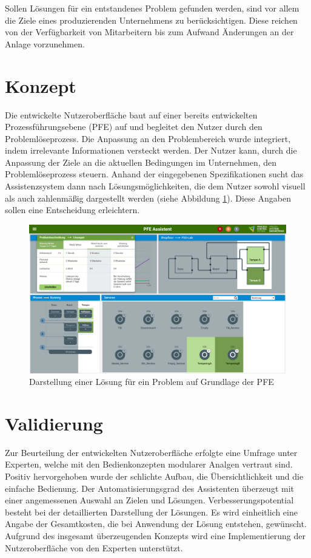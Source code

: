 \documentclass{ifaPoster}
\begin{document}
Sollen Lösungen für ein entstandenes Problem gefunden werden, sind vor allem die Ziele eines produzierenden Unternehmens zu berücksichtigen.
Diese reichen von der Verfügbarkeit von Mitarbeitern bis zum Aufwand Änderungen an der Anlage vorzunehmen.

\section{Konzept}
Die entwickelte Nutzeroberfläche baut auf einer bereits entwickelten Prozessführungsebene (PFE) auf und begleitet den Nutzer durch den Problemlöseprozess. Die Anpassung an den Problembereich wurde integriert, indem irrelevante Informationen versteckt werden. Der Nutzer kann, durch die Anpassung der Ziele an die aktuellen Bedingungen im Unternehmen, den Problemlöseprozess steuern. Anhand der eingegebenen Spezifikationen sucht das Assistenzsystem dann nach Lösungsmöglichkeiten, die dem Nutzer sowohl visuell als auch zahlenmäßig dargestellt werden (siehe Abbildung \ref{PFE-Loesungen}). Diese Angaben sollen eine Entscheidung erleichtern.
\begin{figure}[htbp]
\centering
\includegraphics[scale=0.42]{DA_files/Prototyp-PFE-Loesung2.png}
\caption{Darstellung einer Lösung für ein Problem auf Grundlage der PFE}
\label{PFE-Loesungen}
\end{figure}

\section{Validierung}
Zur Beurteilung der entwickelten Nutzeroberfläche erfolgte eine Umfrage unter Experten, welche mit den Bedienkonzepten modularer Analgen vertraut sind. Positiv hervorgehoben wurde der schlichte Aufbau, die Übersichtlichkeit und die einfache Bedienung. Der Automatisierungsgrad des Assistenten überzeugt mit einer angemessenen Auswahl an Zielen und Lösungen. Verbesserungspotential besteht bei der detaillierten Darstellung der Lösungen. Es wird einheitlich eine Angabe der Gesamtkosten, die bei Anwendung der Lösung entstehen, gewünscht. Aufgrund des insgesamt überzeugenden Konzepts wird eine Implementierung der Nutzeroberfläche von den Experten unterstützt.
\end{document}

